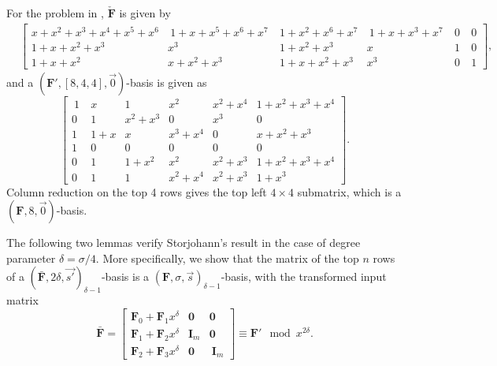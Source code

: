 \begin{example}
\label{exm:auxiliaryTransformation}For the problem in ,
$\check{\mathbf{F}}$ is given by 
\begin{align*}
 & \left[{\begin{array}{cccccr}
x+x^{2}+x^{3}+x^{4}+x^{5}+x^{6} & \ 1+x+x^{5}+x^{6}+x^{7}\  & 1+x^{2}+x^{6}+x^{7} & \ 1+x+x^{3}+x^{7}\  & 0\  & 0\\
1+x+x^{2}+x^{3} & x^{3} & 1+x^{2}+x^{3} & x & 1\  & 0\\
1+x+x^{2} & x+x^{2}+x^{3} & 1+x+x^{2}+x^{3} & x^{3} & 0\  & 1
\end{array}}\right],
\end{align*}
 and a $\left(\mathbf{F}',\left[8,4,4\right],\vec{0}\right)$-basis
is given as 
\[
\left[\begin{array}{cccc|cc}
~1~ & x & 1 & x^{2} & x^{2}+x^{4} & 1+x^{2}+x^{3}+x^{4}\\
0 & 1 & x^{2}+x^{3} & 0 & x^{3} & 0\\
1 & 1+x & x & x^{3}+x^{4} & 0 & x+x^{2}+x^{3}\\
1 & 0 & 0 & 0 & 0 & 0\\
\hline 0 & 1 & 1+x^{2} & x^{2} & x^{2}+x^{3} & 1+x^{2}+x^{3}+x^{4}\\
0 & 1 & 1 & x^{2}+x^{4} & x^{2}+x^{3} & 1+x^{3}
\end{array}\right].
\]
 Column reduction on the top 4 rows gives the top left $4\times4$
submatrix, which is a \textbf{$(\mathbf{F},8,\vec{0})$}-basis. 
\end{example}
The following two lemmas verify Storjohann's result in the case of
degree parameter $\delta=\sigma/4$. More specifically, we show that
the matrix of the top $n$ rows of a $(\bar{\mathbf{F}},2\delta,\vec{s'})_{\delta-1}$-basis
is a $\left(\mathbf{F},\sigma,\vec{s}\right)_{\delta-1}$-basis, with
the transformed input matrix 
\begin{equation}
\bar{\mathbf{F}}=\left[\begin{array}{l|cc}
\mathbf{F}_{0}+\mathbf{F}_{1}x^{\delta} & \mathbf{0} & \mathbf{0}\\
\hline \mathbf{F}_{1}+\mathbf{F}_{2}x^{\delta} & \mathbf{I}_{m} & \mathbf{0}\\
\mathbf{F}_{2}+\mathbf{F}_{3}x^{\delta} & \mathbf{0} & ~\mathbf{I}_{m}
\end{array}\right]\equiv\mathbf{F}'\mod x^{2\delta}.\label{eq:storjohannTransformation4parts}
\end{equation}


